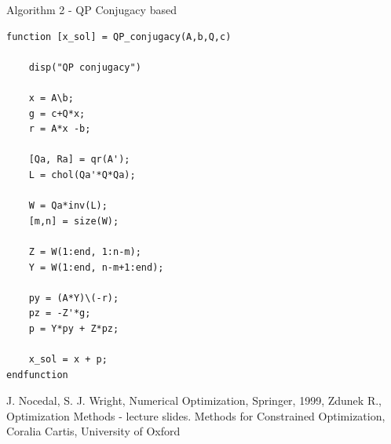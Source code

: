 \documentclass[eng,openany]{mgr}
\begin{document}
Algorithm 2 - QP Conjugacy based\\
\begin{lstlisting}
function [x_sol] = QP_conjugacy(A,b,Q,c)

	disp("QP conjugacy")
	
	x = A\b;
	g = c+Q*x;
	r = A*x -b;
	
	[Qa, Ra] = qr(A');
	L = chol(Qa'*Q*Qa);
	
	W = Qa*inv(L);
	[m,n] = size(W);
	
	Z = W(1:end, 1:n-m);
	Y = W(1:end, n-m+1:end);
	
	py = (A*Y)\(-r);
	pz = -Z'*g;
	p = Y*py + Z*pz;
	
	x_sol = x + p;
endfunction
\end{lstlisting}
\begin{thebibliography}{8}
J. Nocedal, S. J. Wright, Numerical Optimization, Springer, 1999,
Zdunek R., Optimization Methods - lecture slides.
Methods for Constrained Optimization,
Coralia Cartis, University of Oxford
\end{thebibliography}
\end{document}
